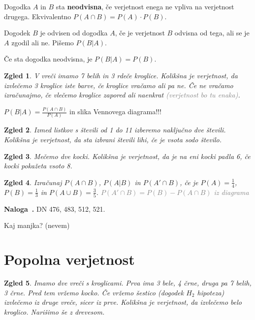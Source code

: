 \documentclass{article}
\newcounter{example}[section]
\newenvironment{example}[1][]{\refstepcounter{example}\par\medskip
   \noindent \textbf{Naloga~\theexample. #1} \rmfamily}{\medskip}
\newtheorem*{zgled}{Zgled}
\begin{document}
Dogodka $A$ in $B$ sta \textbf{neodvisna}, če verjetnost enega ne vpliva na verjetnost drugega. Ekvivalentno $P\left(A\cap B\right) =P(A)\cdot P(B)$.

Dogodek $B$ je odvisen od dogodka $A$, če je verjetnost $B$ odvisna od tega, ali se je $A$ zgodil ali ne. Pišemo $P(B|A)$.

Če sta dogodka neodvisna, je $P(B|A)=P(B)$.

\begin{zgled}
    V vreči imamo 7 belih in 3 rdeče kroglice. Kolikšna je verjetnost, da izvlečemo 3 kroglice iste barve, če kroglice vračamo ali pa ne. Če ne vračamo izračunajmo, če vlečemo kroglice zapored ali naenkrat \textcolor{gray}{(verjetnost bo tu enaka)}.
\end{zgled}

$P(B|A)=\frac{P(A\cap B)}{P(A)}$ in slika Vennovega diagrama!!!

\begin{zgled}
    Izmed listkov s števili od 1 do 11 izberemo naključno dve števili. Kolikšna je verjetnost, da sta izbrani števili lihi, če je vsota sodo število.
\end{zgled}

\begin{zgled}
    Mečemo dve kocki. Kolikšna je verjetnost, da je na eni kocki padla 6, če kocki pokažeta vsoto 8.
\end{zgled}

\begin{zgled}
    Izračunaj $P(A\cap B)$, $P(A|B)$ in $P(A' \cap B)$, če je $P(A)=\frac{1}{4}$, $P(B)=\frac{1}{3}$ in $P(A \cup B)=\frac{3}{5}$. \textcolor{gray}{$P(A' \cap B)=P(B)-P(A\cap B)$ iz diagrama}
\end{zgled}

\begin{example}
    DN 476, 483, 512, 521.
\end{example}


Kaj manjka? (nevem)

\section*{Popolna verjetnost}

\begin{zgled}
    Imamo dve vreči s kroglicami. Prva ima 3 bele, 4 črne, druga pa 7 belih, 3 črne. Pred tem vržemo kocko. Če vržemo šestico (dogodek $H_2$ \textit{hipoteza}) izvlečemo iz druge vreče, sicer iz prve. Kolikšna je verjetnost, da izvlečemo belo kroglico. Narišimo še z drevesom.
\end{zgled}
\end{document}

